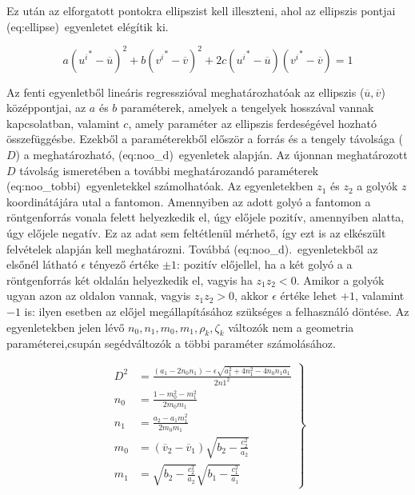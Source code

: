 \documentclass[a4paper,12pt,twoside]{article}
\begin{document}
Ez után az elforgatott pontokra ellipszist kell illeszteni, ahol az ellipszis pontjai \aref({eq:ellipse})~egyenletet elégítik ki. 

\begin{equation}
\label{eq:ellipse}
a \left ( {u^i}^* - \overline{u} \right )^2 + b  \left ( {v^i}^* - \overline{v} \right )^2 + 2c  \left ( {u^i}^* - \overline{u} \right ) \left ({v^i}^* - \overline{v} \right ) = 1
\end{equation}


Az fenti egyenletből lineáris regresszióval meghatározhatóak az ellipszis ($\overline{u}, \overline{v}$) középpontjai, az $a$ és $b$ paraméterek, amelyek a tengelyek hosszával vannak kapcsolatban, valamint $c$, amely paraméter az ellipszis ferdeségével hozható összefüggésbe.  Ezekből a paraméterekből először a forrás és a tengely távolsága ($D$) a meghatározható, \aref({eq:noo_d})~egyenletek alapján. Az újonnan meghatározott $D$ távolság ismeretében a további meghatározandó paraméterek \aref({eq:noo_tobbi})~egyenletekkel számolhatóak. Az egyenletekben $z_1$ és $z_2$ a golyók $z$ koordinátájára utal a fantomon. Amennyiben az adott golyó a fantomon a röntgenforrás vonala felett helyezkedik el, úgy előjele pozitív, amennyiben alatta, úgy előjele negatív. Ez az adat sem feltétlenül mérhető, így ezt is az elkészült felvételek alapján kell meghatározni. Továbbá \aref({eq:noo_d}).~egyenletekből az elsőnél látható $\epsilon$ tényező értéke $\pm1$: pozitív előjellel, ha a két golyó a a röntgenforrás két oldalán helyezkedik el, vagyis ha $z_1z_2 < 0$. Amikor a golyók ugyan azon az oldalon vannak, vagyis $z_1z_2>0$, akkor $\epsilon$ értéke lehet $+1$, valamint $-1$ is: ilyen esetben az előjel megállapításához szükséges a felhasználó döntése. Az egyenletekben jelen lévő $n_0, n_1, m_0, m_1, \rho_k, \zeta_k$ változók nem a geometria paraméterei,csupán segédváltozók a többi paraméter számolásához.

\begin{equation}
\label{eq:noo_d}
\left.
\begin{split}
D^2 &= \frac{(a_1- 2n_0n_1 )- \epsilon \sqrt{a_1^2+ 4n_1^2 - 4n_0n_1a_1}}{2n1^2}\\
n_0&= \frac {1-m_0^2-m_1^2}{2m_0m_1}\\
n_1&= \frac{a_2-a_1m_1^2}{2m_0m_1}\\ 
m_0 &=\left ( \overline{v}_2 - \overline{v}_1 \right) \sqrt{b_2-\frac{c_2^2}{a_2}}\\
m_1 &= \sqrt{b_2 - \frac{c_2^2}{a_2}} \sqrt{b_1- \frac{c_1^2}{a_1}} 
\end{split}
\right\}
\end{equation}
\end{document}
